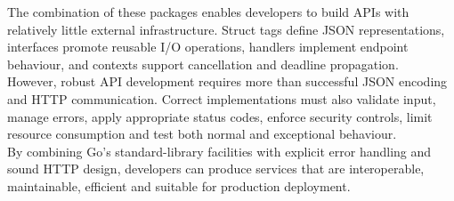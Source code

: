 The combination of these packages enables developers to build APIs with relatively little external infrastructure. Struct tags define JSON representations, interfaces promote reusable I/O operations, handlers implement endpoint behaviour, and contexts support cancellation and deadline propagation.\\

However, robust API development requires more than successful JSON encoding and HTTP communication. Correct implementations must also validate input, manage errors, apply appropriate status codes, enforce security controls, limit resource consumption and test both normal and exceptional behaviour.\\

By combining Go's standard-library facilities with explicit error handling and sound HTTP design, developers can produce services that are interoperable, maintainable, efficient and suitable for production deployment.